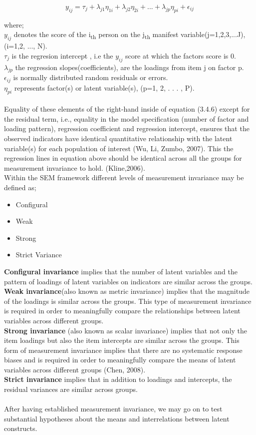 \documentclass[12pt]{article}
\begin{document}
$$y_{ij}=\tau_j + \lambda_{j1}\eta_{1i}+\lambda_{j2}\eta_{2i}+...+\lambda_{jp}\eta_{pi}+\epsilon_{ij}$$

\noindent where;\\
\noindent $y_{ij}$ denotes the score of the i\textsubscript{th} person on the j\textsubscript{th} manifest variable(j=1,2,3,...J), (i=1,2, ..., N).\\
\noindent $\tau_j$ is the regresion intercept , i.e the $y_{ij}$  score at which the factors score is 0.\\
\noindent $\lambda_{jp}$ the regression slopes(coefficients), are the loadings from item j on factor p. \\
\noindent $\epsilon_{ij}$ is normally distributed random residuals or errors. \\
\noindent $\eta_{pi}$ represents factor(s) or latent variable(s), (p=1, 2, . . . , P).\\\\
\noindent Equality of these elements of the right-hand inside of equation (3.4.6) except for the residual term, i.e., equality in the model specification (number of factor and loading pattern), regression coefficient and regression intercept, ensures that the observed indicators have identical quantitative relationship with the latent variable(s) for each population of interest (Wu, Li, Zumbo, 2007). This the regression lines in equation above should be identical across all the groups for measurement invariance to hold. (Kline,2006).\\
\noindent Within the SEM framework different levels of measurement invariance may be defined as; 
\begin{itemize}
	\item Configural
	\item Weak
	\item Strong
	\item Strict Variance
\end{itemize}
\textbf{Configural invariance} implies that the number of latent variables and the pattern of loadings of latent variables on indicators are similar across the groups. \\
\textbf{Weak invariance}(also known as metric invariance) implies that the magnitude of the loadings is similar across the groups. This type of measurement invariance is required in order to meaningfully compare the relationships between latent variables across different groups. \\
\textbf{Strong invariance} (also known as scalar invariance) implies that not only the item loadings but also the item intercepts are similar across the groups. This form of measurement invariance implies that there are no systematic response biases and is required in order to meaningfully compare the means of latent variables across different groups (Chen, 2008).\\
\textbf{Strict invariance} implies that in addition to loadings and intercepts, the residual variances are similar across groups.\\\\
After having established measurement invariance, we may go on to test substantial hypotheses about the means and interrelations between latent constructs.
\end{document}
